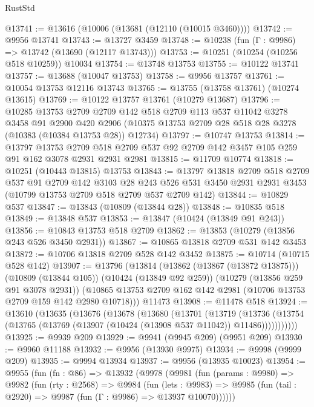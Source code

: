 \begin{lexlean}{RustStd}
\begin{coremodule}
@13741 := @13616 (@10006 (@13681 (@12110 (@10015 @3460))))
@13742 := @9956 @13741
@13743 := @13727 @3459
@13748 := @10238 (fun (Γ : @9986) => @13742 (@13690 (@12117 @13743)))
@13753 := @10251 (@10254 (@10256 @518 @10259)) @10034
@13754 := @13748 @13753
@13755 := @10122 @13741
@13757 := @13688 (@10047 @13753)
@13758 := @9956 @13757
@13761 := @10054 @13753 @12116 @13743
@13765 := @13755 (@13758 @13761) (@10274 @13615)
@13769 := @10122 @13757 @13761 (@10279 @13687)
@13796 := @10285
    @13753
    @2709
    @2709
    @142
    @518
    @2709
    @113
    @537
    @11042
    @3278
    @3458
    @91
    @2900
    @420
    @2906
    (@10375 @13753 @2709 @28 @518 @28 @3278 (@10383 (@10384 @13753 @28)) @12734)
@13797 := @10747 @13753
@13814 := @13797
    @13753
    @2709
    @518
    @2709
    @537
    @92
    @2709
    @142
    @3457
    @105
    @259
    @91
    @162
    @3078
    @2931
    @2931
    @2981
@13815 := @11709 @10774
@13818 := @10251 (@10443 @13815) @13753
@13843 := @13797
    @13818
    @2709
    @518
    @2709
    @537
    @91
    @2709
    @142
    @3103
    @28
    @243
    @526
    @531
    @3450
    @2931
    @2931
    @3453
    (@10799 @13753 @2709 @518 @2709 @537 @2709 @142)
@13844 := @10829 @537
@13847 := @13843 (@10809 (@13844 @28))
@13848 := @10835 @518
@13849 := @13848 @537
@13853 := @13847 (@10424 (@13849 @91 @243))
@13856 := @10843 @13753 @518 @2709
@13862 := @13853 (@10279 (@13856 @243 @526 @3450 @2931))
@13867 := @10865 @13818 @2709 @531 @142 @3453
@13872 := @10706 @13818 @2709 @528 @142 @3452
@13875 := @10714 (@10715 @528 @142)
@13907 := @13796
    (@13814
      (@13862 (@13867 (@13872 @13875)))
      (@10809 (@13844 @105))
      (@10424 (@13849 @92 @259))
      (@10279 (@13856 @259 @91 @3078 @2931))
      (@10865 @13753 @2709 @162 @142 @2981 (@10706 @13753 @2709 @159 @142 @2980 @10718)))
    @11473
@13908 := @11478 @518
@13924 := @13610
    (@13635
      (@13676
        (@13678
          (@13680
            (@13701
              (@13719
                (@13736
                  (@13754 (@13765 (@13769 (@13907 (@10424 (@13908 @537 @11042)) @11486)))))))))))
@13925 := @9939 @209
@13929 := @9941 (@9945 @209) (@9951 @209)
@13930 := @9960 @11188
@13932 := @9956 (@13930 @9975)
@13934 := @9998 (@9999 @209)
@13935 := @9994 @13934
@13937 := @9956 (@13935 @10023)
@13954 := @9955
    (fun (fn : @86) =>
    @13932
      (@9978
        (@9981
          (fun (params : @9980) =>
          @9982
            (fun (rty : @2568) =>
            @9984
              (fun (lets : @9983) =>
              @9985 (fun (tail : @2920) => @9987 (fun (Γ : @9986) => @13937 @10070))))))

\end{coremodule}
\end{lexlean}
